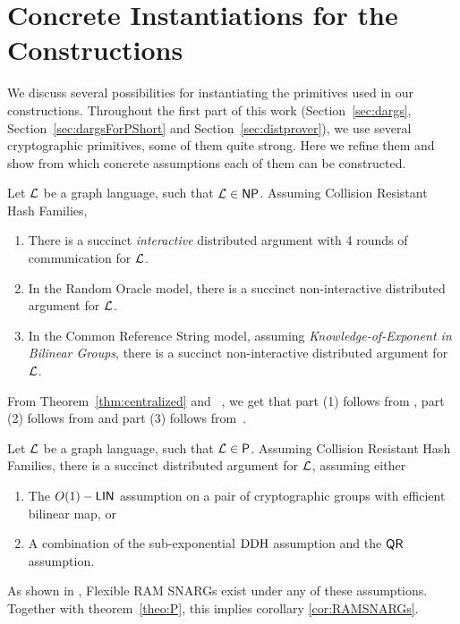 \section{Concrete Instantiations for the Constructions }\label{app:concrete}
We discuss several possibilities for instantiating the primitives used in our constructions. Throughout the first part of this work (Section~\ref{sec:dargs}, Section~\ref{sec:dargsForPShort} and Section~\ref{sec:distprover}), we use several cryptographic primitives, some of them quite strong. Here we refine them and show from which concrete assumptions each of them can be constructed. 

\begin{theorem}\label{thm:concDargs}
    Let $\mathcal{L}$ be a graph language, such that $\mathcal{L}\in {\mathsf{NP}}$. Assuming Collision Resistant Hash Families,
    \begin{enumerate}
        \item There is a succinct \emph{interactive} distributed argument with 4 rounds of communication for $\mathcal{L}$. 
        \item In the Random Oracle model, there is a succinct non-interactive distributed argument for $\mathcal{L}$.
        \item In the Common Reference String model, assuming \emph{Knowledge-of-Exponent in Bilinear Groups}, there is a succinct non-interactive distributed argument for $\mathcal{L}$. 
    \end{enumerate}
\end{theorem}
From Theorem~\ref{thm:centralized} and ~\cite{merkle1989certified}, we get that part (1) follows from \cite{kilian1992note}, part (2) follows from \cite{micali2000computationally} and part (3) follows from~\cite{bitansky2013SNARKsLIPs}.

\begin{theorem}\label{thm:concDargs}
    Let $\mathcal{L}$ be a graph language, such that $\mathcal{L}\in {\mathsf{P}}$. Assuming Collision Resistant Hash Families, there is a succinct distributed argument for $\mathcal{L}$, assuming either
    \begin{enumerate}
        \item The $O(1)-\mathsf{LIN}$ assumption on a pair of cryptographic groups with efficient bilinear map, or
        \item A combination of the sub-exponential $\mathrm{DDH}$ assumption and the $\mathsf{QR}$ assumption.
    \end{enumerate}
\end{theorem}
As shown in  \cite{cryptoeprint:2022/1320}, Flexible RAM SNARGs exist under any of these assumptions. Together with theorem~\ref{theo:P}, this implies corollary \ref{cor:RAMSNARGs}.

